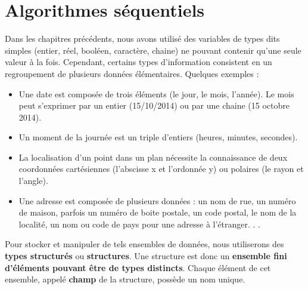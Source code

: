 \documentclass[11pt,a4paper]{article}
\begin{document}
            \section{Algorithmes s\'equentiels}
        Dans les chapitres pr\'ec\'edents, nous avons utilis\'e des variables de types dits \guillemotleft  simples \guillemotright 
        (entier, r\'eel, bool\'een, caract\`ere, chaine) ne pouvant contenir qu'une seule valeur \`a la fois.
        Cependant, certains types d'information consistent en un regroupement de plusieurs donn\'ees
        \'el\'ementaires. Quelques exemples :
        
					\begin{itemize}
				
			\item Une date est compos\'ee de trois \'el\'ements (le jour, le mois, l'ann\'ee). Le mois peut
            s'exprimer par un entier (15/10/2014) ou par une chaine (15 octobre 2014).
          
			\item 
            Un moment de la journ\'ee est un triple d'entiers (heures, minutes, secondes).
          
			\item 
            La localisation d'un point dans un plan n\'ecessite la connaissance de deux coordonn\'ees
            cart\'esiennes (l'abscisse x et l'ordonn\'ee y) ou polaires (le rayon et l'angle).
          
			\item 
            Une adresse est compos\'ee de plusieurs donn\'ees : un nom de rue, un num\'ero de maison,
            parfois un num\'ero de boite postale, un code postal, le nom de la localit\'e, un nom ou
            code de pays pour une adresse \`a l'\'etranger. . .
          
					\end{itemize}
				
            \par
        
        Pour stocker et manipuler de tels ensembles de donn\'ees, nous utiliserons des 
        \textbf{types structur\'es} ou \textbf{structures}. 
        Une structure est donc un \textbf{ensemble fini d'\'el\'ements pouvant \^etre de types distincts}. 
        Chaque \'el\'ement de cet ensemble, appel\'e \textbf{champ} de la structure, poss\`ede un nom unique.
      
            \par
        
\end{document}
